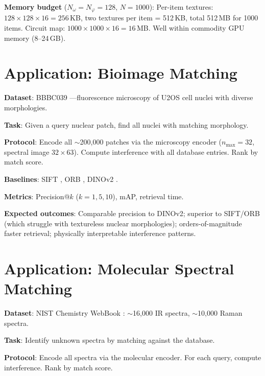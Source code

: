 \documentclass[11pt,twocolumn,a4paper]{article}
\begin{document}
\textbf{Memory budget} ($N_\omega = N_\varphi = 128$, $N = 1000$):
Per-item textures: $128 \times 128 \times 16 = 256$\,KB, two textures
per item = 512\,KB, total 512\,MB for 1000 items. Circuit map:
$1000 \times 1000 \times 16 = 16$\,MB. Well within commodity GPU memory
(8--24\,GB).



\section{Application: Bioimage Matching}
\label{sec:app_bioimage}

\textbf{Dataset}: BBBC039 \citep{ljosa2012, caicedo2019}---fluorescence
microscopy of U2OS cell nuclei with diverse morphologies.

\textbf{Task}: Given a query nuclear patch, find all nuclei with matching
morphology.

\textbf{Protocol}: Encode all $\sim$200{,}000 patches via the microscopy
encoder ($n_{\max} = 32$, spectral image $32 \times 63$). Compute
interference with all database entries. Rank by match score.

\textbf{Baselines}: SIFT \citep{lowe2004}, ORB \citep{rublee2011},
DINOv2 \citep{oquab2023}.

\textbf{Metrics}: Precision@$k$ ($k = 1, 5, 10$), mAP, retrieval time.

\textbf{Expected outcomes}: Comparable precision to DINOv2; superior to
SIFT/ORB (which struggle with textureless nuclear morphologies);
orders-of-magnitude faster retrieval; physically interpretable
interference patterns.


\section{Application: Molecular Spectral Matching}
\label{sec:app_molecular}

\textbf{Dataset}: NIST Chemistry WebBook \citep{nist2023}: $\sim$16{,}000
IR spectra, $\sim$10{,}000 Raman spectra.

\textbf{Task}: Identify unknown spectra by matching against the database.

\textbf{Protocol}: Encode all spectra via the molecular encoder. For each
query, compute interference. Rank by match score.
\end{document}
